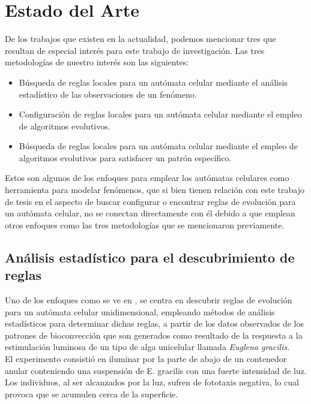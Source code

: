 \chapter{Estado del Arte}

De los trabajos que existen en la actualidad, podemos mencionar tres que resultan de especial interés para este trabajo de investigación. Las tres metodologías de nuestro interés son las siguientes:
\begin{itemize}
	\item Búsqueda de reglas locales para un autómata celular mediante el análisis estadístico de las observaciones de un fenómeno.
	\item Configuración de reglas locales para un autómata celular mediante el empleo de algoritmos evolutivos.
	\item Búsqueda de reglas locales para un autómata celular mediante el empleo de algoritmos evolutivos para satisfacer un patrón específico.
\end{itemize}

Estos son algunos de los enfoques para emplear los autómatas celulares como herramienta para modelar fenómenos, que si bien tienen relación con este trabajo de tesis en el aspecto de buscar configurar o encontrar reglas de evolución para un autómata celular, no se conectan directamente con él debido a que emplean otros enfoques como las tres metodologías que se mencionaron previamente.

\section{Análisis estadístico para el descubrimiento de reglas }

Uno de los enfoques como se ve en \citep{kawaharada2016cellular}, se centra en descubrir reglas de evolución para un autómata celular unidimensional, empleando métodos de análisis estadísticos para determinar dichas reglas, a partir de los datos observados de los patrones de bioconvección que son generados como resultado de la respuesta a la estimulación luminosa de un tipo de alga unicelular llamada \emph{Euglena gracilis}.
\\

El experimento consistió en iluminar por la parte de abajo de un contenedor anular conteniendo una suspensión de E. gracilis con una fuerte intensidad de luz. Los individuos, al ser alcanzados por la luz, sufren de fototaxis negativa, lo cual provoca que se acumulen cerca de la superficie.
\\

